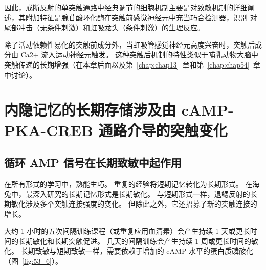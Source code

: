 因此，戒断反射的单突触通路中经典调节的细胞机制主要是对致敏机制的详细阐述，其附加特征是腺苷酸环化酶在突触前感觉神经元中充当巧合检测器，识别 对尾部冲击（无条件刺激）和虹吸龙头（条件刺激）的生理反应。


除了活动依赖性易化的突触前成分外，当虹吸管感觉神经元高度兴奋时，突触后成分由 Ca2+ 流入运动神经元触发。
这种突触后机制的特性类似于哺乳动物大脑中突触传递的长期增强（在本章后面以及第~\ref{chap:chap13}~章和第~\ref{chap:chap54}~章中讨论）。



\section{内隐记忆的长期存储涉及由 cAMP-PKA-CREB 通路介导的突触变化}

\subsection{循环 AMP 信号在长期致敏中起作用}

在所有形式的学习中，熟能生巧。
重复的经验将短期记忆转化为长期形式。
在海兔中，最深入研究的长期记忆形式是长期敏化。
与短期形式一样，退鳃反射的长期敏化涉及多个突触连接强度的变化。
但除此之外，它还招募了新的突触连接的增长。


大约 1 小时的五次间隔训练课程（或重复应用血清素）会产生持续 1 天或更长时间的长期敏化和长期突触促进。
几天的间隔训练会产生持续 1 周或更长时间的敏化。
长期致敏与短期致敏一样，需要依赖于增加的 cAMP 水平的蛋白质磷酸化（图~\ref{fig:53_6}）。


